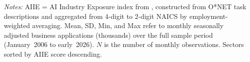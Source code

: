 \begin{table}[H]
\begin{threeparttable}
\begin{tabular}{lcrrrrrr}
\bottomrule
\end{tabular}
\begin{tablenotes}[flushleft]\footnotesize
  \item \textit{Notes:} AIIE = AI Industry Exposure index from \citet{felten2021occupational}, constructed from O*NET task descriptions and aggregated from 4-digit to 2-digit NAICS by employment-weighted averaging. Mean, SD, Min, and Max refer to monthly seasonally adjusted business applications (thousands) over the full sample period (January~2006 to early~2026). $N$ is the number of monthly observations. Sectors sorted by AIIE score descending.
\end{tablenotes}
\end{threeparttable}
\end{table}
